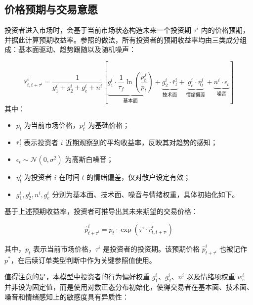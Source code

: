 \subsection{价格预期与交易意愿}
\label{subsec:price expectation}

投资者进入市场时，会基于当前市场状态构造未来一个投资期 \(\tau^i\) 内的价格预期，并据此计算预期收益率。参照\textcite{chiarella2009impact}的做法，所有投资者的预期收益率均由三类成分组成：基本面驱动、趋势跟随以及随机噪声：

\begin{equation}
    \hat{r}_{t,t+\tau^i}^i = 
    \frac{1}{g_1^i + g_2^i + g_e^i + n^i } 
    \left[
    \underbrace{g_1^i \cdot \frac{1}{\tau_f} \ln\left(\frac{p_t^f}{p_t}\right)}_{\text{基本面}} 
    + \underbrace{g_2^i \cdot \bar{r}_t^i}_{\text{技术面}} 
    + \underbrace{g_e^i \cdot \eta_t^i}_{\text{情绪偏差}}
    + \underbrace{n^i \cdot \epsilon_t}_{\text{噪音}} 
    \right]
    \end{equation}
    其中：
    \begin{itemize}
      \item \( p_t \) 为当前市场价格，\( p_t^f \) 为基础价格；
      \item \( \bar{r}_t^i \) 表示投资者 \(i\) 近期观察到的平均收益率，反映其对趋势的感知；
      \item \( \epsilon_t \sim \mathcal{N}(0, \sigma^2) \) 为高斯白噪音；
      \item \( \eta_t^i \) 为投资者 \(i\) 在时间 \(t\) 的情绪偏差，仅对散户设定有效；
      \item \( g_1^i, g_2^i, n^i, g_e^i \) 分别为基本面、技术面、噪音与情绪权重，具体初始化如下。
    \end{itemize}

    基于上述预期收益率，投资者可推导出其未来期望的交易价格：

\begin{equation}
\widehat{p}_{t+\tau^i}^i = p_t \cdot \exp\left( \tau^i \cdot \widehat{r}_{t,t+\tau^i}^i \right)
\label{eq:expected_price}
\end{equation}

其中，\( p_t \) 表示当前市场价格，\( \tau^i \) 是投资者的投资期。该预期价格 \( \widehat{p}_{t+\tau^i}^i \) 也被记作 \( p^* \)，在后续订单类型判断中作为关键参照值使用。

值得注意的是，本模型中投资者的行为偏好权重 \(g_1^i\)、\(g_2^i\)、\(n^i\) 以及情绪项权重 \(w_e^i\) 并非设为固定值，而是使用对数正态分布初始化，使得交易者在基本面、技术面、噪音和情绪感知上的敏感度具有异质性：

